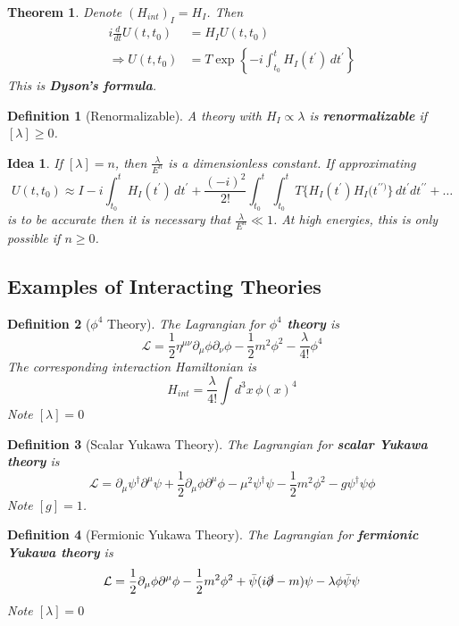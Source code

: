 \documentclass{article}
\newtheorem{theorem}{Theorem}[subsection]
\newtheorem{definition}{Definition}[subsection]
\newtheorem*{idea}{Idea}
\newcommand{\del}{\partial}
\newcommand{\bam}[1]{\textbf{#1}}
\newcommand{\mc}[1]{\mathcal{#1}}
\begin{document}
\begin{theorem}
Denote $(H_{int})_I = H_I$. Then 
\begin{align*}
i \frac{d}{dt} U(t,t_0) &= H_I U(t,t_0) \\
\Rightarrow U(t,t_0) &= T \exp\left\{ -i \int_{t_0}^t H_I(t^\prime) \, dt^\prime \right\}
\end{align*}
This is \bam{Dyson's formula}. 
\end{theorem}

\begin{definition}[Renormalizable]
A theory with $H_I \propto \lambda$ is \bam{renormalizable} if $[\lambda]\geq0$. 
\end{definition}

\begin{idea}
If $[\lambda]=n$, then $\frac{\lambda}{E^n}$ is a dimensionless constant. If approximating 
\[
U(t,t_0) \approx I -i\int_{t_0}^t H_I(t^\prime) \, dt^\prime + \frac{(-i)^2}{2!}\int_{t_0}^t \int_{t_0}^t T\{ H_I(t^\prime) H_I(t^{\prime\prime)} \} \, dt^\prime dt^{\prime\prime} + \dots
\]
is to be accurate then it is necessary that $\frac{\lambda}{E^n} \ll 1$. At high energies, this is only possible if $n\geq0$.
\end{idea}

\subsection{Examples of Interacting Theories}

\begin{definition}[$\phi^4$ Theory]
The Lagrangian for \bam{$\phi^4$ theory} is 
\[
\mc{L} = \frac{1}{2}\eta^{\mu\nu} \del_\mu\phi \del_\nu\phi-\frac{1}{2}m^2\phi^2 - \frac{\lambda}{4!}\phi^4
\]
The corresponding interaction Hamiltonian is 
\[
H_{int} = \frac{\lambda}{4!} \int d^3x \, {\phi(x)}^4
\]
Note $[\lambda]=0$
\end{definition}

\begin{definition}[Scalar Yukawa Theory]
The Lagrangian for \bam{scalar Yukawa theory} is 
\[
\mc{L} = \del_\mu\psi^\dagger \del^\mu\psi+\frac{1}{2}\del_\mu\phi \partial^\mu\phi-\mu^2\psi^\dagger\psi-\frac{1}{2}m^2 \phi^2-g\psi^\dagger\psi\phi
\]
Note $[g]=1$.
\end{definition}

\begin{definition}[Fermionic Yukawa Theory]
The Lagrangian for \bam{fermionic Yukawa theory} is
\[
\mc{L} = \frac{1}{2}\del_\mu\phi \partial^\mu\phi-\frac{1}{2}m^2 \phi^2 + \bar{\psi}(i\slashed{\del}-m)\psi - \lambda\phi\bar{\psi}\psi
\]
Note $[\lambda] = 0$
\end{definition}
\end{document}
